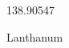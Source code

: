 \documentclass[12pt]{article}
\begin{document}
\hfill{}
\vfill
\begin{center}
  {\fontsize{50}{60}
  }

  138.90547

Lanthanum
\end{center}
\vfill
\end{document}
